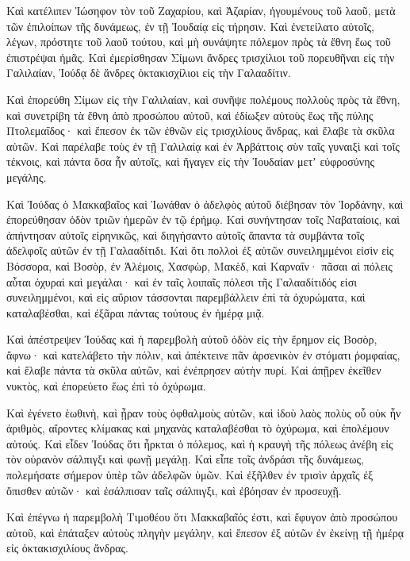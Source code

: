 {Καὶ κατέλιπεν Ἰώσηφον τὸν τοῦ Ζαχαρίου, καὶ Ἀζαρίαν, ἡγουμένους τοῦ λαοῦ, μετὰ τῶν ἐπιλοίπων τῆς δυνάμεως, ἐν τῇ Ἰουδαίᾳ εἰς τήρησιν.
Καὶ ἐνετείλατο αὐτοῖς, λέγων, πρόστητε τοῦ λαοῦ τούτου, καὶ μὴ συνάψητε πόλεμον πρὸς τὰ ἔθνη ἕως τοῦ ἐπιστρέψαι ἡμᾶς.
Καὶ ἐμερίσθησαν Σίμωνι ἄνδρες τρισχίλιοι τοῦ πορευθῆναι εἰς τὴν Γαλιλαίαν, Ἰούδᾳ δὲ ἄνδρες ὀκτακισχίλιοι εἰς τὴν Γαλααδίτιν.
\par }{\PP {}Καὶ ἐπορεύθη Σίμων εἰς τὴν Γαλιλαίαν, καὶ συνῆψε πολέμους πολλοὺς πρὸς τὰ ἔθνη, καὶ συνετρίβη τὰ ἔθνη ἀπὸ προσώπου αὐτοῦ,
καὶ ἐδίωξεν αὐτοὺς ἕως τῆς πύλης Πτολεμαΐδος· καὶ ἔπεσον ἐκ τῶν ἐθνῶν εἰς τρισχιλίους ἄνδρας, καὶ ἔλαβε τὰ σκῦλα αὐτῶν.
Καὶ παρέλαβε τοὺς ἐν τῇ Γαλιλαίᾳ καὶ ἐν Ἀρβάττοις σὺν ταῖς γυναιξὶ καὶ τοῖς τέκνοις, καὶ πάντα ὅσα ἦν αὐτοῖς, καὶ ἤγαγεν εἰς τὴν Ἰουδαίαν μετʼ εὐφροσύνης μεγάλης.
\par }{\PP {}Καὶ Ἰούδας ὁ Μακκαβαῖος καὶ Ἰωνάθαν ὁ ἀδελφὸς αὐτοῦ διέβησαν τὸν Ἰορδάνην, καὶ ἐπορεύθησαν ὁδὸν τριῶν ἡμερῶν ἐν τῷ ἐρήμῳ.
Καὶ συνήντησαν τοῖς Ναβαταίοις, καὶ ἀπήντησαν αὐτοῖς εἰρηνικῶς, καὶ διηγήσαντο αὐτοῖς ἅπαντα τὰ συμβάντα τοῖς ἀδελφοῖς αὐτῶν ἐν τῇ Γαλααδίτιδι.
Καὶ ὅτι πολλοὶ ἐξ αὐτῶν συνειλημμένοι εἰσὶν εἰς Βόσσορα, καὶ Βοσὸρ, ἐν Ἀλέμοις, Χασφὼρ, Μακὲδ, καὶ Καρναΐν· πᾶσαι αἱ πόλεις αὗται ὀχυραὶ καὶ μεγάλαι·
καὶ ἐν ταῖς λοιπαῖς πόλεσι τῆς Γαλααδίτιδός εἰσι συνειλημμένοι, καὶ εἰς αὔριον τάσσονται παρεμβάλλειν ἐπὶ τὰ ὀχυρώματα, καὶ καταλαβέσθαι, καὶ ἐξᾶραι πάντας τούτους ἐν ἡμέρᾳ μιᾷ.
\par }{\PP {}Καὶ ἀπέστρεψεν Ἰούδας καὶ ἡ παρεμβολὴ αὐτοῦ ὁδὸν εἰς τὴν ἔρημον εἰς Βοσὸρ, ἄφνω· καὶ κατελάβετο τὴν πόλιν, καὶ ἀπέκτεινε πᾶν ἀρσενικὸν ἐν στόματι ῥομφαίας, καὶ ἔλαβε πάντα τὰ σκῦλα αὐτῶν, καὶ ἐνέπρησεν αὐτὴν πυρί.
Καὶ ἀπῇρεν ἐκεῖθεν νυκτὸς, καὶ ἐπορεύετο ἕως ἐπὶ τὸ ὀχύρωμα.
\par }{\PP {}Καὶ ἐγένετο ἑωθινὴ, καὶ ᾖραν τοὺς ὀφθαλμοὺς αὐτῶν, καὶ ἰδοὺ λαὸς πολὺς οὗ οὐκ ἦν ἀριθμὸς, αἴροντες κλίμακας καὶ μηχανὰς καταλαβέσθαι τὸ ὀχύρωμα, καὶ ἐπολέμουν αὐτούς.
Καὶ εἶδεν Ἰούδας ὅτι ἦρκται ὁ πόλεμος, καὶ ἡ κραυγὴ τῆς πόλεως ἀνέβη εἰς τὸν οὐρανὸν σάλπιγξι καὶ φωνῇ μεγάλῃ.
Καὶ εἶπε τοῖς ἀνδράσι τῆς δυνάμεως, πολεμήσατε σήμερον ὑπὲρ τῶν ἀδελφῶν ὑμῶν.
Καὶ ἐξῆλθεν ἐν τρισὶν ἀρχαῖς ἐξ ὄπισθεν αὐτῶν· καὶ ἐσάλπισαν ταῖς σάλπιγξι, καὶ ἐβόησαν ἐν προσευχῇ.
\par }{\PP {}Καὶ ἐπέγνω ἡ παρεμβολὴ Τιμοθέου ὅτι Μακκαβαῖός ἐστι, καὶ ἔφυγον ἀπὸ προσώπου αὐτοῦ, καὶ ἐπάταξεν αὐτοὺς πληγὴν μεγάλην, καὶ ἔπεσον ἐξ αὐτῶν ἐν ἐκείνῃ τῇ ἡμέρᾳ εἰς ὀκτακισχιλίους ἄνδρας.
}
